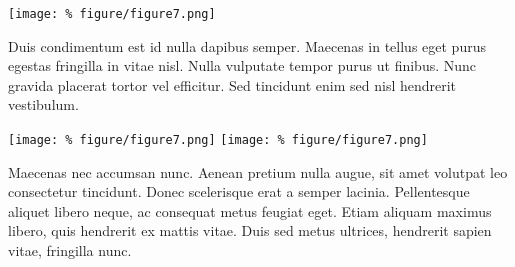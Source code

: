 \documentclass[unknownkeysallowed,usepdftitle=false, aspectratio=169, parskip=full]{beamer}
\newcommand{\secvariable}{nothing}
\newcommand{\mysection}[1]{\renewcommand{\secvariable}{#1}
}
\begin{document}
\mysection{minor}
\begin{frame}\label{\secvariable} %
\begin{center}
\texttt{[image: \%
figure/figure7.png]}
\end{center}
\vspace{-0.2cm}

Duis condimentum est id nulla dapibus semper. Maecenas in tellus eget purus egestas fringilla in vitae nisl. Nulla vulputate tempor purus ut finibus. Nunc gravida placerat tortor vel efficitur. Sed tincidunt enim sed nisl hendrerit vestibulum. 

\end{frame}


\begin{frame}\label{\secvariable}

%
\texttt{[image: \%
figure/figure7.png]}\hspace{.05\textwidth}
\texttt{[image: \%
figure/figure7.png]}

Maecenas nec accumsan nunc. Aenean pretium nulla augue, sit amet volutpat leo consectetur tincidunt. Donec scelerisque erat a semper lacinia. Pellentesque aliquet libero neque, ac consequat metus feugiat eget. Etiam aliquam maximus libero, quis hendrerit ex mattis vitae. Duis sed metus ultrices, hendrerit sapien vitae, fringilla nunc. 

\end{frame}
\end{document}
